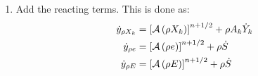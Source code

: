 \begin{enumerate}
\begin{enumerate}
  \item Add the reacting terms.  This is done as:
    \begin{align}
      \dot{y}_{\rho X_k} &= {\left [\mathcal{A} \left(\rho X_k\right)\right]}^{n+1/2} + \rho A_k \dot{Y}_k \\
      \dot{y}_{\rho e} &= {\left [\mathcal{A} \left(\rho e\right)\right]}^{n+1/2} +\rho \dot{S} \\
      \dot{y}_{\rho E} &= {\left [\mathcal{A} \left(\rho E\right)\right]}^{n+1/2} + \rho \dot{S}
    \end{align}
      
  \end{enumerate}

\end{enumerate}

